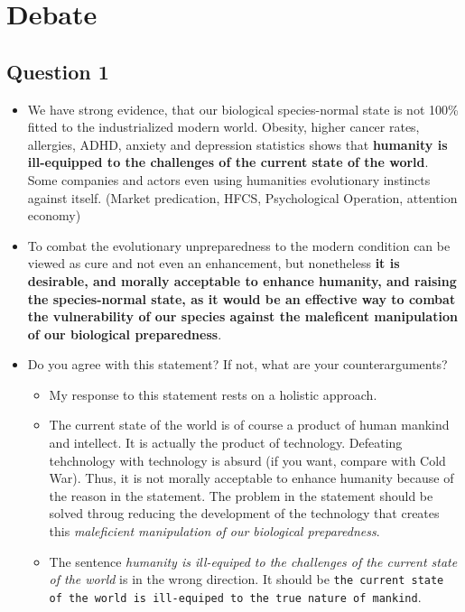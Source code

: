 \documentclass[../main/main.tex]{subfiles}
\begin{document}
\newpage
\section{Debate}
\subsection{Question 1} 
\begin{itemize}
\item We have strong evidence, that our biological species-normal state is not 100\% fitted to the industrialized modern world. Obesity, higher cancer rates, allergies, ADHD, anxiety and depression statistics shows that \textbf{humanity is ill-equipped to the challenges of the current state of the world}. Some companies and actors even using humanities evolutionary instincts against itself. (Market predication, HFCS, Psychological Operation, attention economy)

\item To combat the evolutionary unpreparedness to the modern condition can be viewed as cure and not even an enhancement, but nonetheless \textbf{it is desirable, and morally acceptable to enhance humanity, and raising the species-normal state, as it would be an effective way to combat the vulnerability of our species against the maleficent manipulation of our biological preparedness}. 

\item Do you agree with this statement? If not, what are your counterarguments? 

\begin{itemize}
\item My response to this statement rests on a holistic approach.

\item The current state of the world is of course a product of human mankind and intellect. It is actually the product of technology. Defeating tehchnology with technology is absurd (if you want, compare with Cold War). Thus, it is not morally acceptable to enhance humanity because of the reason in the statement. The problem in the statement should be solved throug reducing the development of the technology that creates this \textit{maleficient manipulation of our biological preparedness}.

\item The sentence \textit{humanity is ill-equiped to the challenges of the current state of the world} is in the wrong direction. It should be \texttt{the current state of the world is ill-equiped to the true nature of mankind}.
\end{itemize}

\end{itemize}
\end{document}
